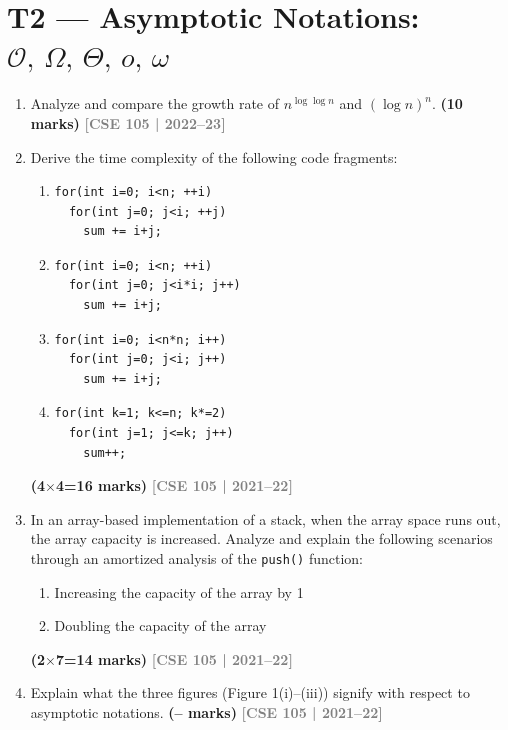 \documentclass[12pt,a3paper]{article}
\newcommand{\yr}[1]{\hfill\textcolor{gray}{\small\textbf{[#1]}}}
\newcommand{\mk}[1]{\textcolor{orange!70!black}{\small\textbf{(#1 marks)}}}
\begin{document}
\section{T2 --- Asymptotic Notations: $\mathcal{O},\,\Omega,\,\Theta,\,o,\,\omega$}

\begin{enumerate}
\item Analyze and compare the growth rate of $n^{\log \log n}$ and $(\log n)^n$. \mk{10}
\yr{CSE 105 | 2022--23}

\item Derive the time complexity of the following code fragments:
\begin{enumerate}
  \item \begin{verbatim}
for(int i=0; i<n; ++i)
  for(int j=0; j<i; ++j)
    sum += i+j;
\end{verbatim}
  \item \begin{verbatim}
for(int i=0; i<n; ++i)
  for(int j=0; j<i*i; j++)
    sum += i+j;
\end{verbatim}
  \item \begin{verbatim}
for(int i=0; i<n*n; i++)
  for(int j=0; j<i; j++)
    sum += i+j;
\end{verbatim}
  \item \begin{verbatim}
for(int k=1; k<=n; k*=2)
  for(int j=1; j<=k; j++)
    sum++;
\end{verbatim}
\end{enumerate}
\mk{4$\times$4=16}
\yr{CSE 105 | 2021--22}

\item In an array-based implementation of a stack, when the array space runs out, the array capacity is increased. Analyze and explain the following scenarios through an amortized analysis of the \texttt{push()} function:
\begin{enumerate}
  \item Increasing the capacity of the array by 1
  \item Doubling the capacity of the array
\end{enumerate}
\mk{2$\times$7=14}
\yr{CSE 105 | 2021--22}

\item  Explain what the three figures (Figure 1(i)--(iii)) signify with respect to asymptotic notations. \mk{--}
\yr{CSE 105 | 2021--22}

\begin{center}
\end{center}
\end{enumerate}
\end{document}
